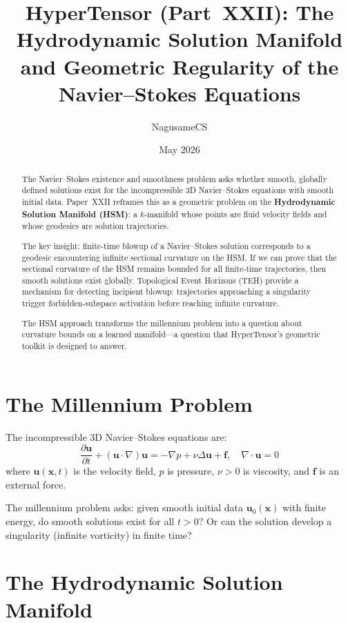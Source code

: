 \documentclass{article}
\title{HyperTensor (Part~XXII): The Hydrodynamic Solution Manifold\\
and Geometric Regularity of the Navier--Stokes Equations}
\author{NagusameCS}
\date{May 2026}
\begin{document}
\maketitle

\begin{abstract}
The Navier--Stokes existence and smoothness problem asks whether smooth,
globally defined solutions exist for the incompressible 3D Navier--Stokes
equations with smooth initial data.  Paper~XXII reframes this as a geometric
problem on the \textbf{Hydrodynamic Solution Manifold (HSM)}: a $k$-manifold
whose points are fluid velocity fields and whose geodesics are solution
trajectories.

The key insight: finite-time blowup of a Navier--Stokes solution corresponds
to a geodesic encountering infinite sectional curvature on the HSM.  If we
can prove that the sectional curvature of the HSM remains bounded for all
finite-time trajectories, then smooth solutions exist globally.  Topological
Event Horizons (TEH) provide a mechanism for detecting incipient blowup:
trajectories approaching a singularity trigger forbidden-subspace activation
before reaching infinite curvature.

The HSM approach transforms the millennium problem into a question about
curvature bounds on a learned manifold---a question that HyperTensor's
geometric toolkit is designed to answer.
\end{abstract}

\section{The Millennium Problem}
\label{sec:ns-problem}

The incompressible 3D Navier--Stokes equations are:
\begin{equation}
\frac{\partial \mathbf{u}}{\partial t} + (\mathbf{u} \cdot \nabla)\mathbf{u}
= -\nabla p + \nu \Delta \mathbf{u} + \mathbf{f}, \quad \nabla \cdot \mathbf{u} = 0
\end{equation}
where $\mathbf{u}(\mathbf{x}, t)$ is the velocity field, $p$ is pressure,
$\nu > 0$ is viscosity, and $\mathbf{f}$ is an external force.

The millennium problem asks: given smooth initial data $\mathbf{u}_0(\mathbf{x})$
with finite energy, do smooth solutions exist for all $t > 0$?  Or can the
solution develop a singularity (infinite vorticity) in finite time?

\section{The Hydrodynamic Solution Manifold}
\label{sec:hsm}
\end{document}
